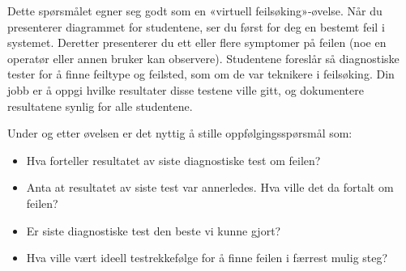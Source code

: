 Dette spørsmålet egner seg godt som en «virtuell feilsøking»-øvelse. Når du presenterer diagrammet for studentene, ser du først for deg en bestemt feil i systemet. Deretter presenterer du ett eller flere symptomer på feilen (noe en operatør eller annen bruker kan observere). Studentene foreslår så diagnostiske tester for å finne feiltype og feilsted, som om de var teknikere i feilsøking. Din jobb er å oppgi hvilke resultater disse testene ville gitt, og dokumentere resultatene synlig for alle studentene.

Under og etter øvelsen er det nyttig å stille oppfølgingsspørsmål som:

\begin{itemize}
\item{} Hva forteller resultatet av siste diagnostiske test om feilen?
\item{} Anta at resultatet av siste test var annerledes. Hva ville det da fortalt om feilen?
\item{} Er siste diagnostiske test den beste vi kunne gjort?
\item{} Hva ville vært ideell testrekkefølge for å finne feilen i færrest mulig steg?
\end{itemize}



